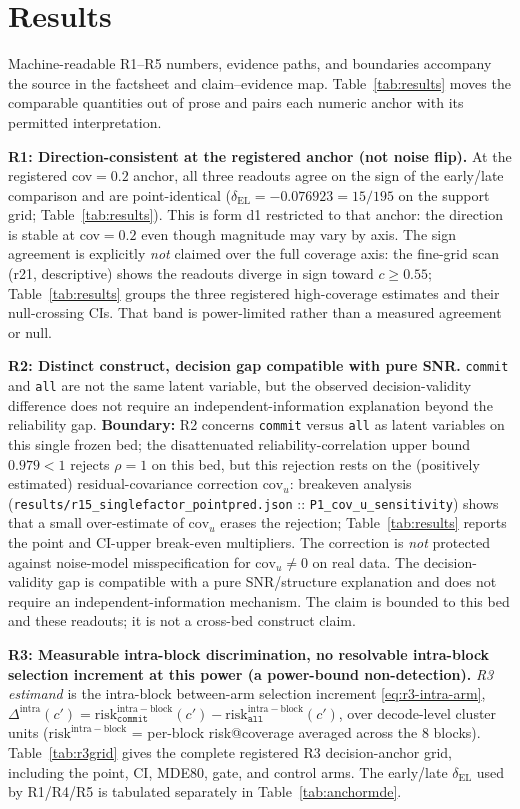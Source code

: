 \documentclass{article}
\begin{document}
\section{Results}
\label{sec:results}

Machine-readable R1--R5 numbers, evidence paths, and boundaries accompany the source in the
factsheet and claim--evidence map. Table~\ref{tab:results} moves the comparable quantities
out of prose and pairs each numeric anchor with its permitted interpretation.

\textbf{R1: Direction-consistent at the registered anchor (not noise flip).} At the
registered cov$=0.2$ anchor, all three readouts agree on the sign of the early/late
comparison and are point-identical ($\delta_{\mathrm{EL}}{=}-0.076923{=}15/195$ on the
support grid; Table~\ref{tab:results}). This is form d1 restricted to that anchor: the
direction is stable at cov$=0.2$ even though magnitude may vary by axis. The sign
agreement is explicitly \emph{not} claimed over the full coverage axis: the fine-grid scan
(r21, descriptive) shows the readouts diverge in sign toward $c\ge0.55$; Table~\ref{tab:results}
groups the three registered high-coverage estimates and their null-crossing CIs. That band
is power-limited rather than a measured agreement or null.

\textbf{R2: Distinct construct, decision gap compatible with pure SNR.} \texttt{commit} and
\texttt{all} are not the same latent variable, but the observed decision-validity difference
does not require an independent-information explanation beyond the reliability gap.
\textbf{Boundary:} R2 concerns \texttt{commit} versus \texttt{all} as latent variables on
this single frozen bed; the disattenuated reliability-correlation upper bound $0.979<1$
rejects $\rho{=}1$ on this bed, but this rejection rests on the (positively estimated)
residual-covariance correction $\mathrm{cov}_u$: breakeven analysis
(\texttt{results/r15\_singlefactor\_pointpred.json} :: \texttt{P1\_cov\_u\_sensitivity})
shows that a small over-estimate of $\mathrm{cov}_u$ erases the rejection; Table~\ref{tab:results}
reports the point and CI-upper break-even multipliers. The correction is \emph{not} protected
against noise-model misspecification for $\mathrm{cov}_u\neq0$ on real data. The
decision-validity gap is compatible with a pure SNR/structure explanation
and does not require an independent-information mechanism. The claim is bounded to this
bed and these readouts; it is not a cross-bed construct claim.

\textbf{R3: Measurable intra-block discrimination, no resolvable intra-block selection
increment at this power (a power-bound non-detection).} \emph{R3 estimand} is the intra-block
between-arm selection increment \eqref{eq:r3-intra-arm},
$\Delta^{\mathrm{intra}}(c')=\mathrm{risk}^{\mathrm{intra-block}}_{\texttt{commit}}(c')-\mathrm{risk}^{\mathrm{intra-block}}_{\texttt{all}}(c')$,
over decode-level cluster units ($\mathrm{risk}^{\mathrm{intra-block}}$ = per-block
risk@coverage averaged across the $8$ blocks). Table~\ref{tab:r3grid} gives the complete
registered R3 decision-anchor grid, including the point, CI, MDE80, gate, and control arms.
The early/late $\delta_{\mathrm{EL}}$ used by R1/R4/R5 is tabulated separately in
Table~\ref{tab:anchormde}.
\end{document}
